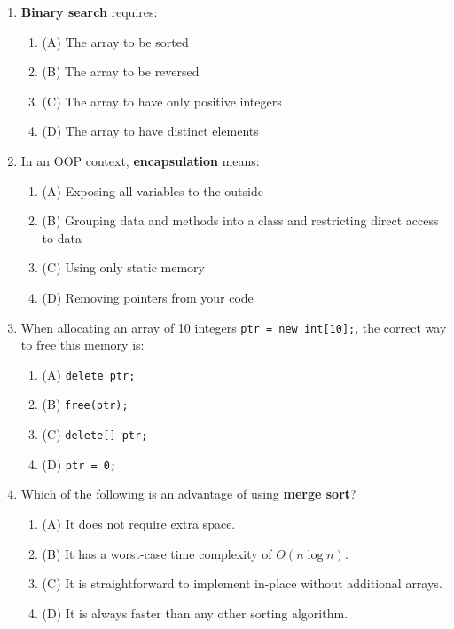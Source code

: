 \documentclass[a4paper,12pt]{article}
\begin{document}
\begin{enumerate}
    \item \textbf{Binary search} requires:
    \begin{enumerate}
        \item (A) The array to be sorted
        \item (B) The array to be reversed
        \item (C) The array to have only positive integers
        \item (D) The array to have distinct elements
    \end{enumerate}

    \item In an OOP context, \textbf{encapsulation} means:
    \begin{enumerate}
        \item (A) Exposing all variables to the outside
        \item (B) Grouping data and methods into a class and restricting direct access to data
        \item (C) Using only static memory
        \item (D) Removing pointers from your code
    \end{enumerate}

    \item When allocating an array of 10 integers \texttt{ptr = new int[10];}, the correct way to free this memory is:
    \begin{enumerate}
        \item (A) \texttt{delete ptr;}
        \item (B) \texttt{free(ptr);}
        \item (C) \texttt{delete[] ptr;}
        \item (D) \texttt{ptr = 0;}
    \end{enumerate}

    \item Which of the following is an advantage of using \textbf{merge sort}?
    \begin{enumerate}
        \item (A) It does not require extra space.
        \item (B) It has a worst-case time complexity of $O(n \log n)$.
        \item (C) It is straightforward to implement in-place without additional arrays.
        \item (D) It is always faster than any other sorting algorithm.
    \end{enumerate}


\end{enumerate}
\end{document}
